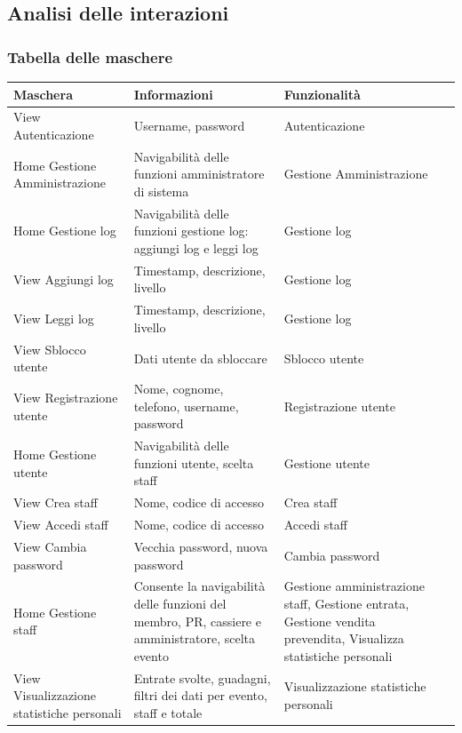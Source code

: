 \documentclass[a4paper]{article}
\begin{document}
\newpage

\subsection{Analisi delle interazioni}
\subsubsection{Tabella delle maschere}

\begin{center}
    \begin{tabularx}{1\textwidth}{|X|X|X|X|}
    \hline
    \textbf{Maschera} & \textbf{Informazioni} & \textbf{Funzionalità}\\
    \hline
    \hline
    View Autenticazione & Username, password & Autenticazione\\
    \hline
    Home Gestione Amministrazione & Navigabilità delle funzioni amministratore di sistema & Gestione Amministrazione\\
    \hline
    Home Gestione log & Navigabilità delle funzioni gestione log: aggiungi log e leggi log & Gestione log\\
    \hline
    View Aggiungi log & Timestamp, descrizione, livello & Gestione log\\
    \hline
    View Leggi log & Timestamp, descrizione, livello & Gestione log\\
    \hline
    View Sblocco utente & Dati utente da sbloccare & Sblocco utente \\
    \hline
    View Registrazione utente & Nome, cognome, telefono, username, password & Registrazione utente\\
    \hline
    Home Gestione utente & Navigabilità delle funzioni utente, scelta staff & Gestione utente\\
    \hline
    View Crea staff & Nome, codice di accesso & Crea staff\\
    \hline
    View Accedi staff & Nome, codice di accesso & Accedi staff\\
    \hline
    View Cambia password & Vecchia password, nuova password & Cambia password\\
    \hline
    Home Gestione staff & Consente la navigabilità delle funzioni del membro, PR, cassiere e amministratore, scelta evento & Gestione amministrazione staff, Gestione entrata, Gestione vendita prevendita, Visualizza statistiche personali\\
    \hline
    View Visualizzazione statistiche personali & Entrate svolte, guadagni, filtri dei dati per evento, staff e totale & Visualizzazione statistiche personali\\

\end{tabularx}
\end{center}
\end{document}
